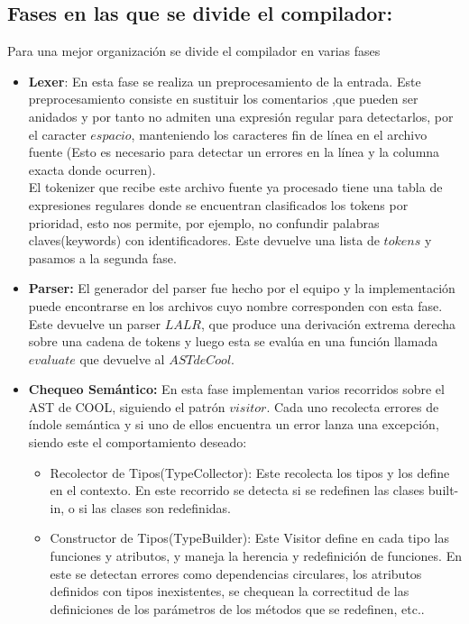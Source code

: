 \documentclass[a4paper, 12pt]{article}
\begin{document}
\subsection*{Fases en las que se divide el compilador:}
Para una mejor organización se divide el compilador en varias fases
\begin{itemize}
\item \textbf{Lexer}: En esta fase se realiza un preprocesamiento de la entrada. 
Este preprocesamiento consiste en sustituir los comentarios ,que pueden ser anidados y 
por tanto no admiten una expresi\'on regular para detectarlos, por el caracter $espacio$, 
manteniendo los caracteres fin de línea en el archivo fuente 
(Esto es necesario para detectar un errores en la línea y la columna exacta donde ocurren).\\
El tokenizer que recibe este archivo fuente ya procesado tiene una tabla de expresiones regulares 
donde se encuentran clasificados los tokens por prioridad, 
esto nos permite, por ejemplo, no confundir palabras claves(keywords) con identificadores. 
Este devuelve una lista de $tokens$ y pasamos a la segunda fase.\\

\item \textbf{Parser:} El generador del parser fue hecho por el equipo y la implementación 
puede encontrarse en los archivos cuyo nombre corresponden con esta fase. 
Este devuelve un parser $LALR$, que produce una derivaci\'on extrema derecha sobre una cadena de tokens y luego 
esta se evalúa en una función llamada $evaluate$ que devuelve al $AST de Cool$.\\

\item \textbf{Chequeo Sem\'antico:} En esta fase implementan varios recorridos sobre el AST de COOL, siguiendo 
el patr\'on $visitor$. 
Cada uno recolecta errores de índole sem\'antica y si uno de ellos encuentra un error lanza una excepción, 
siendo este el comportamiento deseado:
\begin{itemize}
	\item Recolector de Tipos(TypeCollector): Este recolecta los tipos y los define en el contexto. En este recorrido se
	detecta si se redefinen las clases built-in, o si las clases son redefinidas.
	
	\item Constructor de Tipos(TypeBuilder): Este Visitor define en cada tipo las funciones y atributos, 
	y maneja la herencia y redefinición de funciones. 
	En este se detectan errores como dependencias circulares, los atributos definidos con tipos inexistentes, 
	se chequean la correctitud de las definiciones de los par\'ametros de los m\'etodos que se redefinen, etc..


\end{itemize}
\end{itemize}
\end{document}
